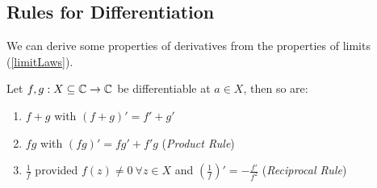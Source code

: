\documentclass[../main.tex]{subfiles}
\begin{document}
\subsection{Rules for Differentiation}
We can derive some properties of derivatives from the properties of limits (\cref{limitLaws}).
\begin{lemma}
  Let $f, g: X \subseteq \mathbb{C} \to \mathbb{C}$ be differentiable at $a \in X$, then so are: \label{diffRules}
  \begin{enumerate}
    \item $f + g$ with $(f + g)' = f' + g'$
    \item $fg$ with $(fg)' = fg' + f'g$ (\textit{Product Rule})
    \item $\frac{1}{f}$ provided $f(z) \neq 0\ \forall z \in X$ and $\left(\frac{1}{f}\right)' = - \frac{f'}{f^2}$ (\textit{Reciprocal Rule})
  \end{enumerate}
\end{lemma}
\end{document}
